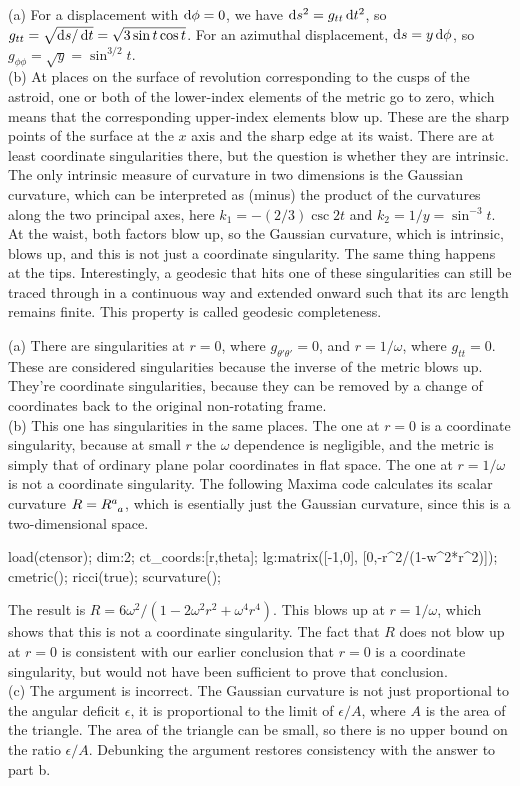 (a) For a displacement with $\operatorname{d\!}\phi=0$, we have $\operatorname{d\!} s^2=g_{tt}\operatorname{d\!} t^2$, so
$g_{tt}=\sqrt{\operatorname{d\!} s/\operatorname{d\!} t}=\sqrt{3\sin t\cos t}$. For an azimuthal displacement,
$\operatorname{d\!} s= y\operatorname{d\!}\phi$, so $g_{\phi\phi}=\sqrt{y}=\sin^{3/2}t$.\\
(b) At places on the surface of revolution corresponding to the cusps of the astroid, one or
both of the lower-index elements of the metric go to zero, which means that the corresponding
upper-index elements blow up. These are the sharp points of the surface at the $x$ axis and
the sharp edge at its waist. There are at least coordinate singularities there, but the question
is whether they are intrinsic. The only intrinsic measure of curvature in two dimensions is the Gaussian
curvature, which can be interpreted as (minus) the product of the curvatures along the two principal axes,
here $k_1=-(2/3)\csc 2t$ and $k_2=1/y=\sin^{-3} t$. At the waist, both factors blow up, so the
Gaussian curvature, which is intrinsic, blows up, and this is not just a coordinate singularity.
The same thing happens at the tips. Interestingly, a geodesic that hits one of these singularities can still be
traced through in a continuous way and extended onward such that its arc length remains finite. This property is
called geodesic completeness.

(a) There are singularities at $r=0$, where $g_{\theta'\theta'}=0$, and $r=1/\omega$,
where $g_{tt}=0$. These are considered singularities because the inverse of the metric
blows up. They're coordinate singularities, because they can be removed by a change of
coordinates back to the original non-rotating frame.\\
(b) This one has singularities in
the same places. The one at $r=0$ is a coordinate singularity, because at small $r$
the $\omega$ dependence is negligible, and the metric is simply that of ordinary
plane polar coordinates in flat space. The one at $r=1/\omega$ is not a coordinate
singularity. The following Maxima code calculates its scalar curvature $R=R\indices{^a_a}$,
which is esentially just the Gaussian curvature, since this is a two-dimensional space.
\begin{listing}{1}
load(ctensor);
dim:2;
ct_coords:[r,theta];
lg:matrix([-1,0],
          [0,-r^2/(1-w^2*r^2)]);
cmetric();   
ricci(true);
scurvature();
\end{listing}
The result is $R=6\omega^2/(1-2\omega^2r^2+\omega^4r^4)$.
This blows up at $r=1/\omega$, which shows that this is not a coordinate
singularity. The fact that $R$ does not blow up at $r=0$ is consistent with our
earlier conclusion that $r=0$ is a coordinate singularity, but would not have been
sufficient to prove that conclusion.\\
(c) The argument is incorrect. The Gaussian curvature is not just proportional to
the angular deficit $\epsilon$, it is proportional to the
limit of $\epsilon/A$, where $A$ is the area of the triangle. The area of the triangle
can be small, so there is no upper bound on the ratio $\epsilon/A$.
Debunking the argument restores consistency with the answer to part b.

